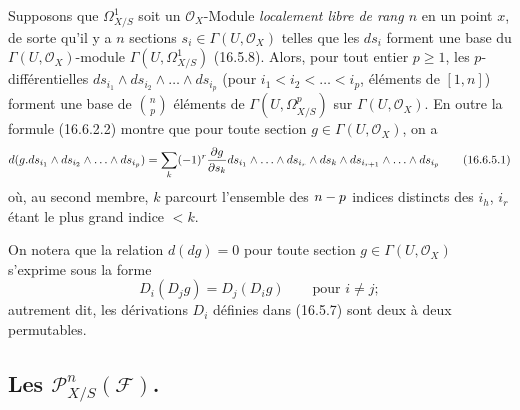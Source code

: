 \begin{env}[16.6.5]
\label{IV.16.6.5}
Supposons que $\varOmega_{X/S}^1$ soit un $\mathcal{O}_X$-Module \emph{localement libre
de rang $n$} en un point $x$, de sorte qu'il y a $n$ sections
$s_i\in\Gamma(U,\mathcal{O}_X)$ telles que les $ds_i$ forment une base du
$\Gamma(U,\mathcal{O}_X)$-module $\Gamma(U,\varOmega_{X/S}^1)$ (16.5.8).
Alors, pour tout entier $p\geq1$, les $p$-différentielles
$ds_{i_1}\wedge ds_{i_2}\wedge\ldots\wedge ds_{i_p}$ (pour
$i_1<i_2<\ldots<i_p$, éléments de $[1,n]$) forment une base de
$\binom{n}{p}$ éléments de $\Gamma(U,\varOmega_{X/S}^p)$ sur
$\Gamma(U,\mathcal{O}_X)$. En outre la formule (16.6.2.2) montre que pour
toute section $g\in\Gamma(U,\mathcal{O}_X)$, on a
\[
  d(g.ds_{i_1}\wedge ds_{i_2}\wedge\ldots\wedge ds_{i_p})
  =\sum_k(- 1)^r\frac{\partial g}{\partial s_k}
  ds_{i_1}\wedge\ldots\wedge ds_{i_r}\wedge ds_k\wedge
  ds_{i_{r+1}}\wedge\ldots\wedge ds_{i_p}
  \tag{16.6.5.1}
  \label{IV.16.6.5.1}
\]
où, au second membre, $k$ parcourt l'ensemble des $n- p$ indices distincts des
$i_h$, $i_r$ étant le plus grand indice $<k$.

On notera que la relation $d(dg)=0$ pour toute section
$g\in\Gamma(U,\mathcal{O}_X)$ s'exprime sous la forme
\[
  D_i(D_jg)=D_j(D_ig)\qquad\text{pour $i\neq j$};
\]
autrement dit, les dérivations $D_i$ définies dans (16.5.7) sont deux à deux
permutables.
\end{env}

\subsection{\texorpdfstring{Les $\mathscr{P}_{X/S}^n(\mathscr{F})$.}{Les P\string_\string^n(F).}}

